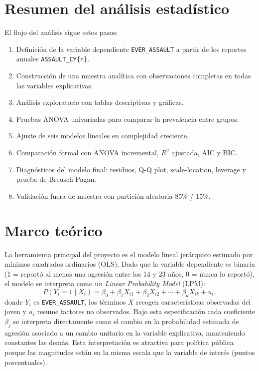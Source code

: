 \documentclass[11pt]{article}
\begin{document}
\section{Resumen del análisis estadístico}

El flujo del análisis sigue estos pasos:
\begin{enumerate}
\item Definición de la variable dependiente \texttt{EVER\_ASSAULT} a partir de los reportes anuales \texttt{ASSAULT\_CY\{n\}}.
\item Construcción de una muestra analítica con observaciones completas en todas las variables explicativas.
\item Análisis exploratorio con tablas descriptivas y gráficas.
\item Pruebas ANOVA univariadas para comparar la prevalencia entre grupos.
\item Ajuste de seis modelos lineales en complejidad creciente.
\item Comparación formal con ANOVA incremental, $R^2$ ajustada, AIC y BIC.
\item Diagnósticos del modelo final: residuos, Q-Q plot, scale-location, leverage y prueba de Breusch-Pagan.
\item Validación fuera de muestra con partición aleatoria 85\% / 15\%.
\end{enumerate}

\section{Marco teórico}

La herramienta principal del proyecto es el modelo lineal jerárquico estimado por mínimos cuadrados ordinarios (OLS). Dado que la variable dependiente es binaria (1 = reportó al menos una agresión entre los 14 y 23 años, 0 = nunca lo reportó), el modelo se interpreta como un \textit{Linear Probability Model} (LPM):
\[
P(Y_i = 1 \mid X_i) = \beta_0 + \beta_1 X_{i1} + \beta_2 X_{i2} + \cdots + \beta_k X_{ik} + u_i,
\]
donde $Y_i$ es \texttt{EVER\_ASSAULT}, los términos $X$ recogen características observadas del joven y $u_i$ resume factores no observados. Bajo esta especificación cada coeficiente $\beta_j$ se interpreta directamente como el cambio en la probabilidad estimada de agresión asociado a un cambio unitario en la variable explicativa, manteniendo constantes las demás. Esta interpretación es atractiva para política pública porque las magnitudes están en la misma escala que la variable de interés (puntos porcentuales).
\end{document}
